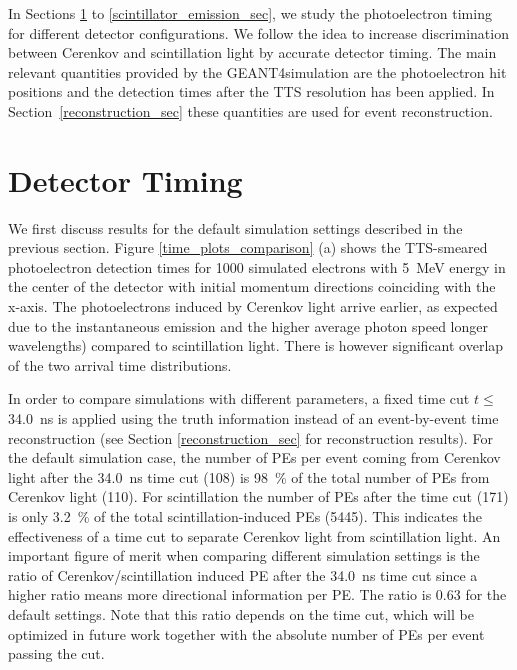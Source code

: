 \documentclass[aps,prc,twocolumn,groupedaddress,showpacs,amsmath,amssymb,floatfix,superscriptaddress]{revtex4}
\newcommand{\GEANT}{GEANT4}
\begin{document}
In Sections \ref{detector_timing_sec} to
\ref{scintillator_emission_sec}, we study the
photoelectron timing for different detector configurations. We follow
the idea to increase discrimination between Cerenkov and scintillation
light by accurate detector timing. The main relevant quantities
provided by the \GEANT simulation are the photoelectron hit positions
and the detection times after the TTS resolution has been applied. In
Section~\ref{reconstruction_sec} these quantities are used for event
reconstruction.

\section{Detector Timing}
\label{detector_timing_sec}

We first discuss results for the default simulation settings described
in the previous section. Figure \ref{time_plots_comparison} (a) shows
the TTS-smeared photoelectron detection times for 1000 simulated
electrons with 5~MeV energy in the center of the detector with initial
momentum directions coinciding with the x-axis. The photoelectrons
induced by Cerenkov light arrive earlier, as expected due to the
instantaneous emission and the higher average photon speed longer
wavelengths) compared to scintillation light. There is however
significant overlap of the two arrival time distributions.  

In order
to compare simulations with different parameters, a fixed time cut $t
\leq$ 34.0~ns  is applied using the truth information 
instead of an event-by-event time reconstruction (see Section
\ref{reconstruction_sec} for reconstruction results). For the default
simulation case, the number of PEs per event coming from Cerenkov
light after the 34.0~ns time cut (108) is 98~\% of the total number of
PEs from Cerenkov light (110). For scintillation the number of PEs
after the time cut (171) is only 3.2~\% of the total
scintillation-induced PEs (5445). This indicates the effectiveness of
a time cut to separate Cerenkov light from scintillation light. An
important figure of merit when comparing different simulation settings
is the ratio of Cerenkov/scintillation induced PE after the 34.0~ns
time cut since a higher ratio means more directional information per
PE. The ratio is 0.63 for the default settings. Note that this ratio
depends on the time cut, which will be optimized in future work
together with the absolute number of PEs per event passing the cut.
\end{document}
